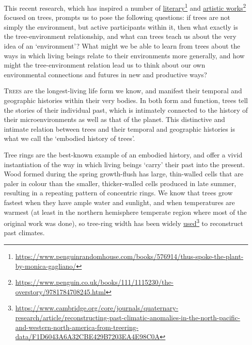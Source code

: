 \documentclass[../main.tex]{subfiles}
\begin{document}
\begin{multicols}{2}
{This recent research, which has inspired a number of \href{https://www.penguinrandomhouse.com/books/576914/thus-spoke-the-plant-by-monica-gagliano/}{literary}\footnote{\url{https://www.penguinrandomhouse.com/books/576914/thus-spoke-the-plant-by-monica-gagliano/}} and \href{https://brill.com/view/title/35267?lang=en}{artistic works}\footnote{\url{https://www.penguin.co.uk/books/111/1115230/the-overstory/9781784708245.html}} focused on trees, prompts us to pose the following questions: if trees are not simply the environment, but active participants within it, then what exactly is the tree-environment relationship, and what can trees teach us about the very idea of an ‘environment’? What might we be able to learn from trees about the ways in which living beings relate to their environments more generally, and how might the tree-environment relation lead us to think about our own environmental connections and futures in new and productive ways? 

\lettrine{T}{rees} are the longest-living life form we know, and manifest their temporal and geographic histories within their very bodies. In both form and function, trees tell the stories of their individual past, which is intimately connected to the history of their microenvironments as well as that of the planet. This distinctive and intimate relation between trees and their temporal and geographic histories is what we call the ‘embodied history of trees’. 

Tree rings are the best-known example of an embodied history, and offer a vivid instantiation of the way in which living beings ‘carry’ their past into the present. Wood formed during the spring growth-flush has large, thin-walled cells that are paler in colour than the smaller, thicker-walled cells produced in late summer, resulting in a repeating pattern of concentric rings. We know that trees grow fastest when they have ample water and sunlight, and when temperatures are warmest (at least in the northern hemisphere temperate region where most of the original work was done), so tree-ring width has been widely \href{https://www.cambridge.org/core/journals/quaternary-research/article/reconstructing-past-climatic-anomalies-in-the-north-pacific-and-western-north-america-from-treering-data/F1D6043A6A32CBE429B7203EA4E98C0A}{used}\footnote{\url{https://www.cambridge.org/core/journals/quaternary-research/article/reconstructing-past-climatic-anomalies-in-the-north-pacific-and-western-north-america-from-treering-data/F1D6043A6A32CBE429B7203EA4E98C0A}} to reconstruct past climates. 

}
\end{multicols}
\end{document}
